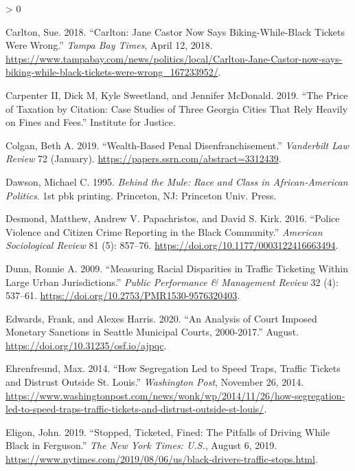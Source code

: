 \documentclass[
  12pt,
]{article}
\newlength{\cslhangindent}
\newenvironment{CSLReferences}[2] %
 {%
  \setlength{\parindent}{0pt}
  \ifodd #1 \everypar{\setlength{\hangindent}{\cslhangindent}}\ignorespaces\fi
  \ifnum #2 > 0
  \setlength{\parskip}{#2\baselineskip}
  \fi
 }%
 {}
\begin{document}
\begin{CSLReferences}{1}{0}
\leavevmode\hypertarget{ref-Carlton2018}{}%
Carlton, Sue. 2018. {``Carlton: {Jane Castor} Now Says Biking-While-Black Tickets Were Wrong.''} \emph{Tampa Bay Times}, April 12, 2018. \url{https://www.tampabay.com/news/politics/local/Carlton-Jane-Castor-now-says-biking-while-black-tickets-were-wrong_167233952/}.

\leavevmode\hypertarget{ref-CarpenterII2019}{}%
Carpenter II, Dick M, Kyle Sweetland, and Jennifer McDonald. 2019. {``The {Price} of {Taxation} by {Citation}: {Case Studies} of {Three Georgia Cities That Rely Heavily} on {Fines} and {Fees}.''} {Institute for Justice}.

\leavevmode\hypertarget{ref-Colgan2019}{}%
Colgan, Beth A. 2019. {``Wealth-{Based Penal Disenfranchisement}.''} \emph{Vanderbilt Law Review} 72 (January). \url{https://papers.ssrn.com/abstract=3312439}.

\leavevmode\hypertarget{ref-Dawson1995}{}%
Dawson, Michael C. 1995. \emph{Behind the Mule: Race and Class in {African}-{American} Politics}. 1st pbk printing. {Princeton, NJ}: {Princeton Univ. Press}.

\leavevmode\hypertarget{ref-Desmond2016}{}%
Desmond, Matthew, Andrew V. Papachristos, and David S. Kirk. 2016. {``Police {Violence} and {Citizen Crime Reporting} in the {Black Community}.''} \emph{American Sociological Review} 81 (5): 857--76. \url{https://doi.org/10.1177/0003122416663494}.

\leavevmode\hypertarget{ref-Dunn2009}{}%
Dunn, Ronnie A. 2009. {``Measuring {Racial Disparities} in {Traffic Ticketing Within Large Urban Jurisdictions}.''} \emph{Public Performance \& Management Review} 32 (4): 537--61. \url{https://doi.org/10.2753/PMR1530-9576320403}.

\leavevmode\hypertarget{ref-Edwards2020}{}%
Edwards, Frank, and Alexes Harris. 2020. {``An {Analysis} of {Court Imposed Monetary Sanctions} in {Seattle Municipal Courts}, 2000-2017.''} August. \url{https://doi.org/10.31235/osf.io/ajpqc}.

\leavevmode\hypertarget{ref-Ehrenfreund2014}{}%
Ehrenfreund, Max. 2014. {``How Segregation Led to Speed Traps, Traffic Tickets and Distrust Outside {St}. {Louis}.''} \emph{Washington Post}, November 26, 2014. \url{https://www.washingtonpost.com/news/wonk/wp/2014/11/26/how-segregation-led-to-speed-traps-traffic-tickets-and-distrust-outside-st-louis/}.

\leavevmode\hypertarget{ref-Eligon2019}{}%
Eligon, John. 2019. {``Stopped, {Ticketed}, {Fined}: {The Pitfalls} of {Driving While Black} in {Ferguson}.''} \emph{The New York Times: U.S.}, August 6, 2019. \url{https://www.nytimes.com/2019/08/06/us/black-drivers-traffic-stops.html}.


\end{CSLReferences}
\end{document}
